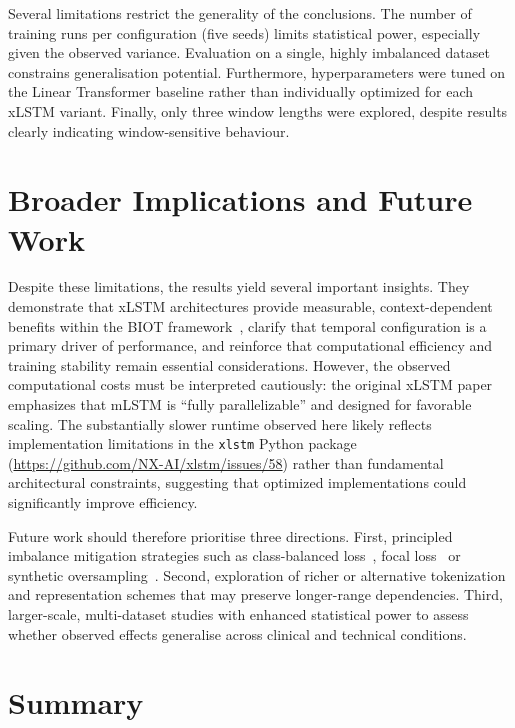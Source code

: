 Several limitations restrict the generality of the conclusions. The number of training runs per configuration (five seeds) limits statistical power, especially given the observed variance. Evaluation on a single, highly imbalanced dataset~\cite{harati2015improved,obeid2016temple} constrains generalisation potential. Furthermore, hyperparameters were tuned on the Linear Transformer baseline rather than individually optimized for each \ac{xLSTM} variant. Finally, only three window lengths were explored, despite results clearly indicating window-sensitive behaviour.

\section{Broader Implications and Future Work}
\label{sec:implications}

Despite these limitations, the results yield several important insights. They demonstrate that \ac{xLSTM} architectures provide measurable, context-dependent benefits within the \ac{BIOT} framework~\cite{yang2023biot}, clarify that temporal configuration is a primary driver of performance, and reinforce that computational efficiency and training stability remain essential considerations. However, the observed computational costs must be interpreted cautiously: the original \ac{xLSTM} paper~\cite{beck2024xlstm} emphasizes that \ac{mLSTM} is ``fully parallelizable'' and designed for favorable scaling. The substantially slower runtime observed here likely reflects implementation limitations in the \texttt{xlstm} Python package (\url{https://github.com/NX-AI/xlstm/issues/58}) rather than fundamental architectural constraints, suggesting that optimized implementations could significantly improve efficiency.

Future work should therefore prioritise three directions. First, principled imbalance mitigation strategies such as class-balanced loss~\cite{cui2019class}, focal loss~\cite{lin2017focal} or synthetic oversampling~\cite{chawla2002smote,he2008adasyn}. Second, exploration of richer or alternative tokenization and representation schemes that may preserve longer-range dependencies. Third, larger-scale, multi-dataset studies with enhanced statistical power to assess whether observed effects generalise across clinical and technical conditions.

\section{Summary}
\label{sec:discussion_summary}

